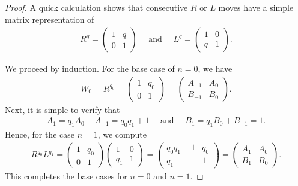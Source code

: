 \documentclass[12pt]{article}
\theoremstyle{plain}
\theoremstyle{definition}
\theoremstyle{remark}
\begin{document}
\begin{proof} A quick calculation shows that consecutive $ R $ or $ L $ moves have a simple matrix representation of
\begin{align*}
	R^q = \begin{pmatrix} 1 & q \\ 0 & 1 \end{pmatrix} \quad \text{ and } \quad L^q = \begin{pmatrix} 1 & 0 \\ q & 1 \end{pmatrix}.
\end{align*}

We proceed by induction. For the base case of $ n = 0 $, we have
\begin{align*}
	W_0 = R^{q_0} = \begin{pmatrix} 1 & q_0 \\ 0 & 1 \end{pmatrix} = \begin{pmatrix} A_{-1} & A_0 \\ B_{-1} & B_0 \end{pmatrix}.
\end{align*}
Next, it is simple to verify that
\begin{align*}
	A_1 = q_1 A_0 + A_{-1} = q_0 q_1 + 1 \quad \text{ and } \quad B_1 = q_1 B_0 + B_{-1} = 1.
\end{align*}
Hence, for the case $ n = 1 $, we compute
\begin{align*}
	R^{q_0} L^{q_1} = \begin{pmatrix} 1 & q_0 \\ 0 & 1 \end{pmatrix} \begin{pmatrix} 1 & 0 \\ q_1 & 1 \end{pmatrix} = \begin{pmatrix} q_0 q_1 + 1 & q_0 \\ q_1 & 1 \end{pmatrix} = \begin{pmatrix} A_1 & A_0 \\ B_1 & B_0 \end{pmatrix}.
\end{align*}
This completes the base cases for $ n = 0 $ and $ n = 1 $.


\end{proof}
\end{document}
